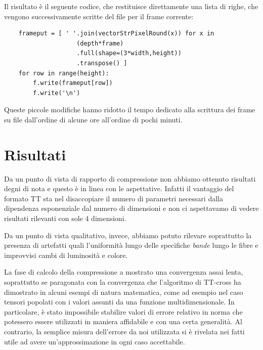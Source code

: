 \documentclass[11pt,a4paper]{article}
\begin{document}
Il risultato è il seguente codice, che restituisce direttamente una lista di righe, che vengono successivamente scritte del file per il frame corrente:
\begin{lstlisting}
    frameput = [ ' '.join(vectorStrPixelRound(x)) for x in 
                    (depth*frame)
                    .full(shape=(3*width,height))
                    .transpose() ]
    for row in range(height):
        f.write(frameput[row])
        f.write('\n')
\end{lstlisting}

Queste piccole modifiche hanno ridotto il tempo dedicato alla scrittura dei frame su file dall'ordine di alcune ore all'ordine di pochi minuti.




\section{Risultati}
Da un punto di vista di rapporto di compressione non abbiamo ottenuto risultati degni di nota e questo è in linea con le aspettative.  Infatti il vantaggio del formato TT sta nel disaccopiare il numero di parametri necessari dalla dipendenza esponenziale dal numero di dimensioni e non ci aspettavamo di vedere risultati rilevanti con sole 4 dimensioni.

Da un punto di vista qualitativo, invece, abbiamo potuto rilevare soprattutto la presenza di artefatti quali l'uniformità lungo delle specifiche \emph{bande} lungo le fibre e improvvisi cambi di luminosità e colore.

La fase di calcolo della compressione a mostrato una convergenza assai lenta, soprattutto se paragonata con la convergenza che l'algoritmo di TT-cross ha dimostrato in alcuni esempi di natura matematica, come ad esempio nel caso tensori popolati con i valori assunti da una funzione multidimensionale.  In particolare, è stato impossibile stabilire valori di errore relativo in norma che potessero essere utilizzati in maniera affidabile e con una certa generalità. Al contrario, la semplice misura dell'errore da noi utilizzata si è rivelata nei fatti utile ad avere un'approssimazione in ogni caso accettabile.
\end{document}
